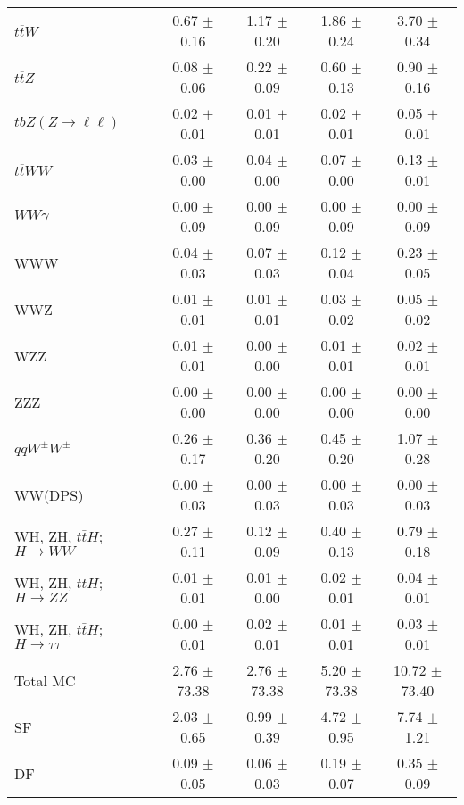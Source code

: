 \begin{tabular}{l|cccc}
                   $t\overline{t}W$ &  0.67 $\pm$  0.16 &  1.17 $\pm$  0.20 &  1.86 $\pm$  0.24 &  3.70 $\pm$  0.34 \\
                   $t\overline{t}Z$ &  0.08 $\pm$  0.06 &  0.22 $\pm$  0.09 &  0.60 $\pm$  0.13 &  0.90 $\pm$  0.16 \\
    $tbZ (Z \rightarrow \ell \ell)$ &  0.02 $\pm$  0.01 &  0.01 $\pm$  0.01 &  0.02 $\pm$  0.01 &  0.05 $\pm$  0.01 \\
                  $t\overline{t}WW$ &  0.03 $\pm$  0.00 &  0.04 $\pm$  0.00 &  0.07 $\pm$  0.00 &  0.13 $\pm$  0.01 \\
                         $WW\gamma$ &  0.00 $\pm$  0.09 &  0.00 $\pm$  0.09 &  0.00 $\pm$  0.09 &  0.00 $\pm$  0.09 \\
                                WWW &  0.04 $\pm$  0.03 &  0.07 $\pm$  0.03 &  0.12 $\pm$  0.04 &  0.23 $\pm$  0.05 \\
                                WWZ &  0.01 $\pm$  0.01 &  0.01 $\pm$  0.01 &  0.03 $\pm$  0.02 &  0.05 $\pm$  0.02 \\
                                WZZ &  0.01 $\pm$  0.01 &  0.00 $\pm$  0.00 &  0.01 $\pm$  0.01 &  0.02 $\pm$  0.01 \\
                                ZZZ &  0.00 $\pm$  0.00 &  0.00 $\pm$  0.00 &  0.00 $\pm$  0.00 &  0.00 $\pm$  0.00 \\
                 $qqW^{\pm}W^{\pm}$ &  0.26 $\pm$  0.17 &  0.36 $\pm$  0.20 &  0.45 $\pm$  0.20 &  1.07 $\pm$  0.28 \\
                            WW(DPS) &  0.00 $\pm$  0.03 &  0.00 $\pm$  0.03 &  0.00 $\pm$  0.03 &  0.00 $\pm$  0.03 \\
WH, ZH, $t\bar{t}H$; $H \rightarrow WW$ &  0.27 $\pm$  0.11 &  0.12 $\pm$  0.09 &  0.40 $\pm$  0.13 &  0.79 $\pm$  0.18 \\
WH, ZH, $t\bar{t}H$; $H \rightarrow ZZ$ &  0.01 $\pm$  0.01 &  0.01 $\pm$  0.00 &  0.02 $\pm$  0.01 &  0.04 $\pm$  0.01 \\
WH, ZH, $t\bar{t}H$; $H \rightarrow \tau\tau$ &  0.00 $\pm$  0.01 &  0.02 $\pm$  0.01 &  0.01 $\pm$  0.01 &  0.03 $\pm$  0.01 \\
\hline\hline
                           Total MC &  2.76 $\pm$ 73.38 &  2.76 $\pm$ 73.38 &  5.20 $\pm$ 73.38 & 10.72 $\pm$ 73.40 \\
\hline
                                 SF &  2.03 $\pm$  0.65 &  0.99 $\pm$  0.39 &  4.72 $\pm$  0.95 &  7.74 $\pm$  1.21 \\
                                 DF &  0.09 $\pm$  0.05 &  0.06 $\pm$  0.03 &  0.19 $\pm$  0.07 &  0.35 $\pm$  0.09 \\

\end{tabular}
